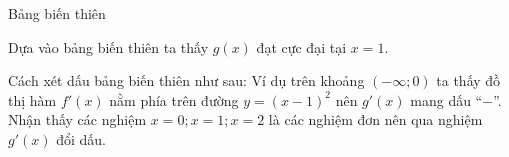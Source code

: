 \begin{ex}
{{
}
\noindent Bảng biến thiên\\
\begin{center}
\end{center}
Dựa vào bảng biến thiên ta thấy $g(x)$ đạt cực đại tại $x=1$. \\
\begin{note}
Cách xét dấu bảng biến thiên như sau: Ví dụ trên khoảng $(-\infty;0)$ ta thấy đồ thị hàm $f'(x)$ nằm phía trên đường $y=(x-1)^2$ nên $g'(x)$ mang dấu ``$-$''. \\
Nhận thấy các nghiệm $x=0; x=1; x=2$ là các nghiệm đơn nên qua nghiệm $g'(x)$ đổi dấu.	
\end{note}
}
\end{ex}
